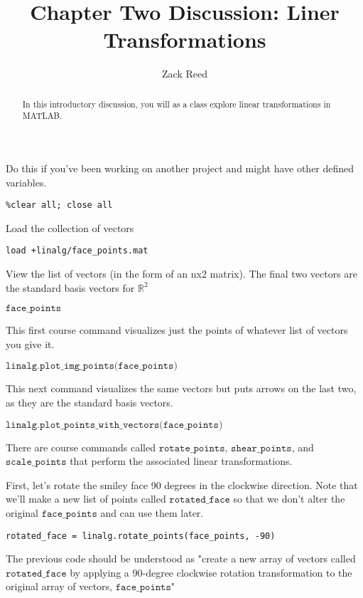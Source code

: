 \documentclass{ximera}
\author{Zack Reed}
\title{Chapter Two Discussion: Liner Transformations}
\begin{document}
\begin{abstract}

    In this introductory discussion, you will as a class explore linear transformations in MATLAB.

\end{abstract}
\maketitle

\begin{exploration}

Do this if you've been working on another project and might have other defined variables.
\begin{verbatim}
%clear all; close all
\end{verbatim}

Load the collection of vectors
\begin{verbatim}load +linalg/face_points.mat\end{verbatim}

View the list of vectors (in the form of an nx2 matrix). The final two vectors are the standard basis vectors for \(\mathbb{R}^2\)

$\texttt{face\_points}$

This first course command visualizes just the points of whatever list of vectors you give it.

$\texttt{linalg.plot\_img\_points(face\_points)}$

This next command visualizes the same vectors but puts arrows on the last two, as they are the standard basis vectors.

$\texttt{linalg.plot\_points\_with\_vectors(face\_points)}$

There are course commands called $\texttt{rotate\_points}$, $\texttt{shear\_points}$, and $\texttt{scale\_points}$ that perform the associated linear transformations.

First, let's rotate the smiley face 90 degrees in the clockwise direction. Note that we'll make a new list of points called $\texttt{rotated\_face}$ so that we don't alter the original $\texttt{face\_points}$ and can use them later.
\begin{verbatim}
rotated_face = linalg.rotate_points(face_points, -90)
\end{verbatim}

The previous code should be understood as "create a new array of vectors called $\texttt{rotated\_face}$ by applying a 90-degree clockwise rotation transformation to the original array of vectors, $\texttt{face\_points}$"


\end{exploration}
\end{document}
